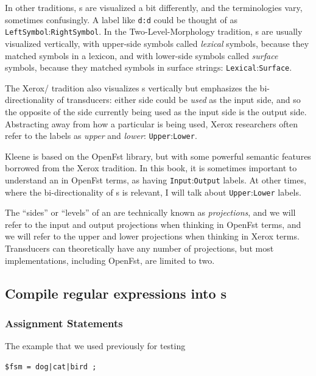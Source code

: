 In other traditions, s are visualized a bit differently, and
the terminologies
vary, sometimes confusingly.  A label like \texttt{d:d} could be thought of as
\texttt{LeftSymbol}:\texttt{RightSymbol}.  In the Two-Level-Morphology tradition,
\fsm{}s are usually  visualized vertically, with upper-side symbols
called \emph{lexical} symbols, because they matched symbols in a lexicon, and
with lower-side symbols called \emph{surface} symbols, because they matched
symbols in surface strings: \texttt{Lexical}:\texttt{Surface}.  

The Xerox/ tradition also visualizes \fsm{}s vertically but
emphasizes the bi-directionality of
transducers: either side could be \emph{used} as the input side, and so the opposite
of the side currently being used as the input side is the output side.  
Abstracting away from how a
particular \fsm{} is being used, Xerox researchers often refer to
the labels as \emph{upper} and \emph{lower}:  \texttt{Upper}:\texttt{Lower}.  

Kleene is based on the OpenFst library, but with some powerful semantic features
borrowed from
the Xerox tradition.  In this book, it is sometimes important to
understand an \fsm{} in OpenFst terms, as having \texttt{Input}:\texttt{Output}
labels.  At other times, where the bi-directionality of \fsm{}s is
relevant, I will talk about \texttt{Upper}:\texttt{Lower} labels. 

The ``sides'' or ``levels'' of an \fsm{} are technically known as
\emph{projections}, and we will refer to the input and output projections when
thinking in OpenFst terms, and we will refer to the upper and lower projections
when thinking in Xerox terms.  Transducers can theoretically have any number of
projections, but most implementations, including OpenFst, are limited to two.

\subsection{Compile regular expressions into \fsm{}s}

\subsubsection{Assignment Statements}

The example that we used previously for testing

\begin{Verbatim}
$fsm = dog|cat|bird ;
\end{Verbatim}

